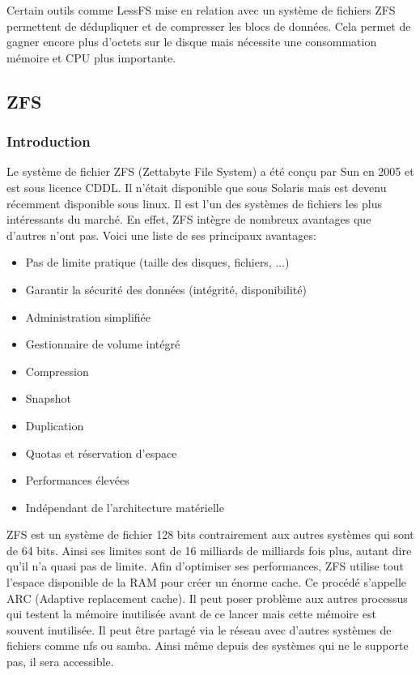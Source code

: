 \documentclass[a4paper,11pt]{report}
\begin{document}
Certain outils comme LessFS mise en relation avec un système de fichiers ZFS permettent de dédupliquer et de compresser les blocs de données. Cela permet de gagner encore plus d'octets sur le disque mais nécessite une consommation mémoire et CPU plus importante.

	\subsection{ZFS}
	\subsubsection{Introduction}
	Le système de fichier ZFS (Zettabyte File System) a été conçu par Sun en 2005 et est sous licence CDDL.  Il n'était disponible que sous Solaris mais est devenu récemment disponible sous linux. Il est l'un des systèmes de fichiers les plus intéressants du marché. En effet, ZFS intègre de nombreux avantages que d'autres n'ont pas. Voici une liste de ses principaux avantages: \\
	\begin{itemize}
		 \item Pas de limite pratique (taille des disques, fichiers, ...)
		 \item Garantir la sécurité des données (intégrité, disponibilité)
		 \item Administration simplifiée
		 \item Gestionnaire de volume intégré
		 \item Compression
		 \item Snapshot
		 \item Duplication
		 \item Quotas et réservation d’espace
		 \item Performances élevées
		 \item Indépendant de l’architecture matérielle\\
	\end{itemize}
	ZFS est un système de fichier 128 bits contrairement aux autres systèmes qui sont de 64 bits. Ainsi ses limites sont de 16 milliards de milliards fois plus, autant dire qu'il n'a quasi pas de limite. Afin d'optimiser ses performances, ZFS utilise tout l'espace disponible de la RAM pour créer un énorme cache. Ce procédé s'appelle ARC (Adaptive replacement cache). Il peut poser problème aux autres processus qui testent la mémoire inutilisée avant de ce lancer mais cette mémoire est souvent inutilisée. Il peut être partagé via le réseau avec d'autres systèmes de fichiers comme nfs ou samba. Ainsi même depuis des systèmes qui ne le supporte pas, il sera accessible.\\
\end{document}
